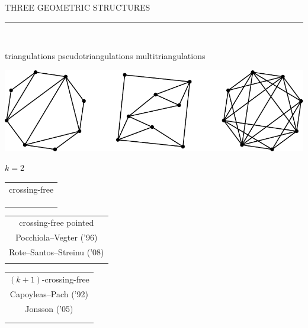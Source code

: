 \documentclass[12pt,titlepage,landscape,a4paper]{article}
\newcommand{\textemoyen}{\fontsize{23}{27}\selectfont}
\newenvironment{slide}[1]
{
\newpage
\begin{center}
{\blue \textemoyen \uppercase{#1}}\\
\end{center}
\vspace{-1cm}
\rule{\textwidth}{0.5 pt}\\
\vspace{-.8cm}
}
{\vspace*{-3cm}}
\newcommand{\violet}{\color{violet}} %
\newcommand{\blue}{\color{blue}} %
\newcommand{\papier}[1]{{\violet\fontsize{15}{20}\selectfont #1}} %
\begin{document}
\begin{slide}{Three geometric structures}

\hspace{1.6cm} triangulations \hspace{3.4cm} pseudotriangulations \hspace{2.5cm} multitriangulations\\
\begin{center}\includegraphics[scale=1.9]{geometricStructures0}\end{center}
\vspace{-1.08cm} \hspace*{25.7cm} ${k=2}$

\hspace{1.7cm} 
\begin{tabular}[t]{c} crossing-free \\ \\[-.3cm] \\ \\  \end{tabular} 
\hspace{3.4cm} 
\begin{tabular}[t]{c} crossing-free pointed \\ \papier{Pocchiola--Vegter ('96)} \\[-.3cm] \papier{Rote--Santos--Streinu ('08)} \\ \\  \end{tabular}
\hspace{2cm} 
\begin{tabular}[t]{c} $(k+1)$-crossing-free \\ \papier{Capoyleas--Pach ('92)} \\[-.3cm] \papier{Jonsson ('05)} \\ \\ \\  \end{tabular}

\end{slide}

\end{document}
